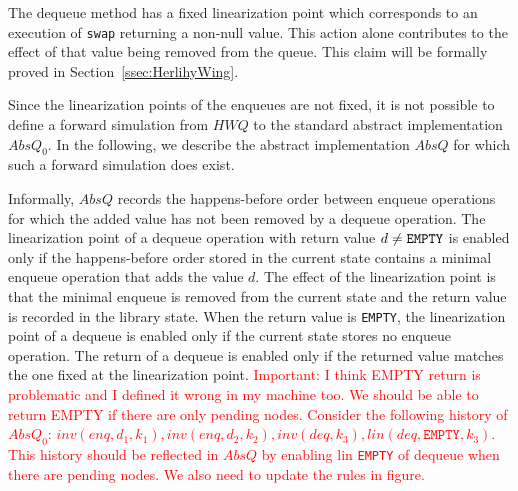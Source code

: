 The dequeue method has a fixed linearization point which corresponds to an execution of {\tt swap} returning a non-null value. This action alone contributes to the effect of that value being removed from the queue. This claim will be formally proved in Section~\ref{ssec:HerlihyWing}.

Since the linearization points of the enqueues are not fixed, it is not possible to define a forward simulation from $\mathit{HWQ}$ to the standard abstract implementation $AbsQ_0$. In the following, we describe the abstract implementation $AbsQ$ for which such a forward simulation does exist.

Informally, $AbsQ$ records the happens-before order between enqueue operations for which the added value has not been removed by a dequeue operation. The linearization point of a dequeue operation with return value $d\neq{\tt EMPTY}$ is enabled only if the happens-before order stored in the current state contains a minimal enqueue operation that adds the value $d$. The effect of the linearization point is that the minimal enqueue is removed from the current state and the return value is recorded in the library state. When the return value is {\tt EMPTY}, the linearization point of a dequeue is enabled only if the current state stores no enqueue operation. The return of a dequeue is enabled only if the returned value matches the one fixed at the linearization point. \textcolor{red}{Important: I think EMPTY return is problematic and I defined it wrong in my machine too. We should be able to return EMPTY if there are only pending nodes. Consider the following history of $AbsQ_0$: $inv(enq, d_1,k_1), inv(enq, d_2,k_2), inv(deq, k_3), lin(deq, \texttt{EMPTY}, k_3)$. This history should be reflected in $AbsQ$ by enabling lin \texttt{EMPTY} of dequeue when there are pending nodes. We also need to update the rules in figure.}

